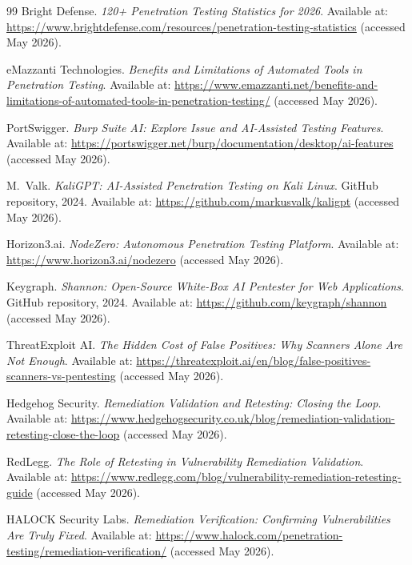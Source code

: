 \documentclass[12pt,a4paper]{report}
\begin{document}
\begin{thebibliography}{99}
Bright Defense.
\textit{120+ Penetration Testing Statistics for 2026}.
Available at: \url{https://www.brightdefense.com/resources/penetration-testing-statistics}
(accessed May 2026).

eMazzanti Technologies.
\textit{Benefits and Limitations of Automated Tools in Penetration Testing}.
Available at: \url{https://www.emazzanti.net/benefits-and-limitations-of-automated-tools-in-penetration-testing/}
(accessed May 2026).


PortSwigger.
\textit{Burp Suite AI: Explore Issue and AI-Assisted Testing Features}.
Available at: \url{https://portswigger.net/burp/documentation/desktop/ai-features}
(accessed May 2026).

M.~Valk.
\textit{KaliGPT: AI-Assisted Penetration Testing on Kali Linux}.
GitHub repository, 2024.
Available at: \url{https://github.com/markusvalk/kaligpt}
(accessed May 2026).

Horizon3.ai.
\textit{NodeZero: Autonomous Penetration Testing Platform}.
Available at: \url{https://www.horizon3.ai/nodezero}
(accessed May 2026).

Keygraph.
\textit{Shannon: Open-Source White-Box AI Pentester for Web Applications}.
GitHub repository, 2024.
Available at: \url{https://github.com/keygraph/shannon}
(accessed May 2026).


ThreatExploit AI.
\textit{The Hidden Cost of False Positives: Why Scanners Alone Are Not Enough}.
Available at: \url{https://threatexploit.ai/en/blog/false-positives-scanners-vs-pentesting}
(accessed May 2026).

Hedgehog Security.
\textit{Remediation Validation and Retesting: Closing the Loop}.
Available at: \url{https://www.hedgehogsecurity.co.uk/blog/remediation-validation-retesting-close-the-loop}
(accessed May 2026).

RedLegg.
\textit{The Role of Retesting in Vulnerability Remediation Validation}.
Available at: \url{https://www.redlegg.com/blog/vulnerability-remediation-retesting-guide}
(accessed May 2026).

HALOCK Security Labs.
\textit{Remediation Verification: Confirming Vulnerabilities Are Truly Fixed}.
Available at: \url{https://www.halock.com/penetration-testing/remediation-verification/}
(accessed May 2026).


\end{thebibliography}
\end{document}
